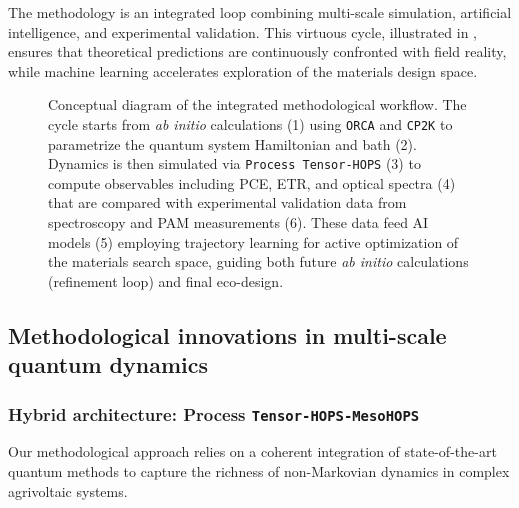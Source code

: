 \documentclass[12pt, a4paper]{article}
\begin{document}
The methodology is an integrated loop combining multi-scale simulation, artificial intelligence, and experimental validation. This virtuous cycle, illustrated in , ensures that theoretical predictions are continuously confronted with field reality, while machine learning accelerates exploration of the materials design space.

\begin{figure}[htb]
\centering
\caption{Conceptual diagram of the integrated methodological workflow. The cycle starts from \textit{ab initio} calculations (1) using \texttt{ORCA} and \texttt{CP2K} to parametrize the quantum system Hamiltonian and bath (2). Dynamics is then simulated via \texttt{Process Tensor-HOPS} (3) to compute observables including PCE, ETR, and optical spectra (4) that are compared with experimental validation data from spectroscopy and PAM measurements (6). These data feed AI models (5) employing trajectory learning for active optimization of the materials search space, guiding both future \textit{ab initio} calculations (refinement loop) and final eco-design.}
\label{fig_workflow_methodo}
\medspace

\end{figure}

\subsection{Methodological innovations in multi-scale quantum dynamics}

\subsubsection{Hybrid architecture: Process \texttt{Tensor-HOPS-MesoHOPS}}

Our methodological approach relies on a coherent integration of state-of-the-art quantum methods to capture the richness of non-Markovian dynamics in complex agrivoltaic systems.
\end{document}
